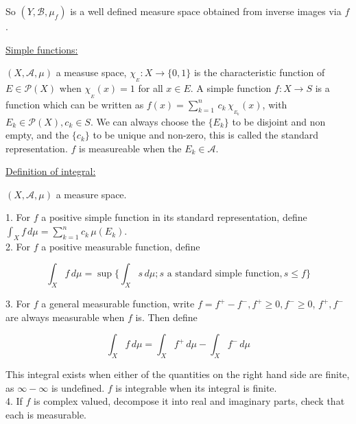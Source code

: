 \documentclass[12pt]{article}
\newcommand{\pset}[1]{ \mathcal{P}(#1) }
\newcommand{\A}[0] { \mathcal{A} }
\newcommand{\B}[0] { \mathcal{B} }
\newcommand{\rarw}[0] { \rightarrow }
\begin{document}
	
\begin{flushleft}
So $ (Y,\B,\mu_f)$ is a well defined measure space obtained from inverse images via $f$.
\end{flushleft}

\begin{flushleft}
\underline{Simple functions:}
\end{flushleft}

\begin{flushleft}
$(X,\A,\mu)$ a measuse space, $\chi_{_E}: X \rarw \{ 0, 1\}$ is the characteristic function of $E \in \pset{X}$ when $\chi_{_E}(x) = 1$ for all $x \in E$. A simple function $f: X \rarw S$ is a function which can be written as $f(x) = \sum_{k = 1}^n \, c_k \, \chi_{_{E_k}}(x)$, with $E_k \in \pset{X}, c_k \in S$. We can always choose the $ \{ E_k \}$ to be disjoint and non empty, and the $ \{ c_k \}$ to be unique and non-zero, this is called the standard representation. $f$ is measureable when the $E_k \in \A$.
\end{flushleft}


\begin{flushleft}
\underline{Definition of integral:}
\end{flushleft}

\begin{flushleft}
$(X,\A,\mu)$ a measure space. 
\end{flushleft}

1. For $f$ a positive simple function in its standard representation, define $\int_X f \, d\mu = \sum_{k=1}^n c_k \,\mu(E_k)$. \\

2. For $f$ a positive measurable function, define

$$
	\int_X f \, d\mu = \sup \{ \int_X s \, d\mu; s \textrm{ a standard simple function}, s \le f \}
$$

3. For $f$ a general measurable function, write $f = f^+ - f^-, f^+ \ge 0, f^- \ge 0$, $f^+, f^-$ are always measurable when $f$ is. Then define 

$$
\int_X f \, d\mu = \int_X f^+ \, d\mu - \int_X f^- \, d\mu 
$$

This integral exists when either of the quantities on the right hand side are finite, as $\infty - \infty$ is undefined. $f$ is integrable when its integral is finite. \\

4. If $f$ is complex valued, decompose it into real and imaginary parts, check that each is measurable.
\end{document}
